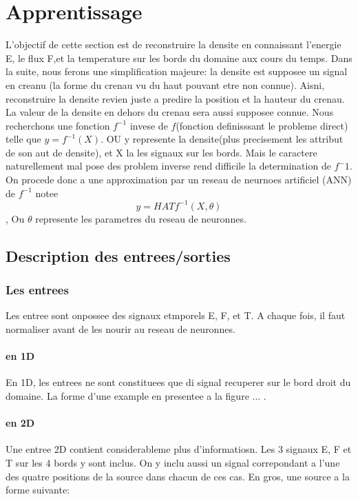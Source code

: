 
\chapter{Apprentissage} %

\label{Chapter4} %

L'objectif de cette section est de reconstruire la densite en connaissant l'energie E, le flux F,et la temperature sur les bords du domaine aux cours du temps. Dans la suite, nous ferons une simplification majeure: la densite est supposee un signal en creanu (la forme du crenau vu du haut pouvant etre non connue). Aisni, reconstruire la densite revien juste a predire la position et la hauteur du crenau. La valeur de la densite en dehors du crenau sera aussi supposee connue. Nous recherchons une fonction $f^{-1}$ invese de $f$(fonction definisssant le probleme direct) telle que $y = f^{-1}(X)$. OU y represente la densite(plus precisement les attribut de son aut de densite), et X la les signaux sur les bords. Mais le caractere naturellement mal pose des problem inverse rend difficile la determination de $f^-1$. On procede donc a une approximation par un reseau de neurnoes artificiel (ANN) de $f^{-1}$ notee $$y = HATf^{-1}(X, \theta)$$, Ou $\theta$ represente les parametres du reseau de neuronnes.


\section{Description des entrees/sorties}

\subsection{Les entrees}
Les entree sont onpossee des signaux etmporels E, F, et T. A chaque fois, il faut normaliser avant de les nourir au reseau de neuronnes. 

\subsubsection{en 1D}
En 1D, les entrees ne sont constituees que di signal recuperer sur le bord droit du domaine. La forme d'une example en presentee a la figure ... .
\subsubsection{en 2D}
Une entree 2D contient considerableme plus d'informatiosn. Les 3 signaux E, F et T sur les 4 bords y sont inclus. On y inclu aussi un signal correpondant a l'une des quatre positions de la source dans chacun de ces cas. En gros, une source a la forme suivante:


